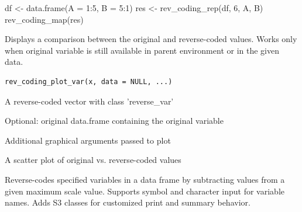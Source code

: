 \documentclass[a4paper]{book}
\begin{document}
%
\begin{Examples}
\begin{ExampleCode}
df <- data.frame(A = 1:5, B = 5:1)
res <- rev_coding_rep(df, 6, A, B)
rev_coding_map(res)
\end{ExampleCode}
\end{Examples}
%
\begin{Description}
Displays a comparison between the original and reverse-coded values.
Works only when original variable is still available in parent environment or in the given data.
\end{Description}
%
\begin{Usage}
\begin{verbatim}
rev_coding_plot_var(x, data = NULL, ...)
\end{verbatim}
\end{Usage}
%
\begin{Arguments}
\begin{ldescription}
\item[\code{x}] A reverse-coded vector with class 'reverse\_var'

\item[\code{data}] Optional: original data.frame containing the original variable

\item[\code{...}] Additional graphical arguments passed to plot
\end{ldescription}
\end{Arguments}
%
\begin{Value}
A scatter plot of original vs. reverse-coded values
\end{Value}
%
\begin{Examples}
\end{Examples}
%
\begin{Description}
Reverse-codes specified variables in a data frame by subtracting values
from a given maximum scale value. Supports symbol and character input
for variable names. Adds S3 classes for customized print and summary behavior.
\end{Description}
\end{document}
